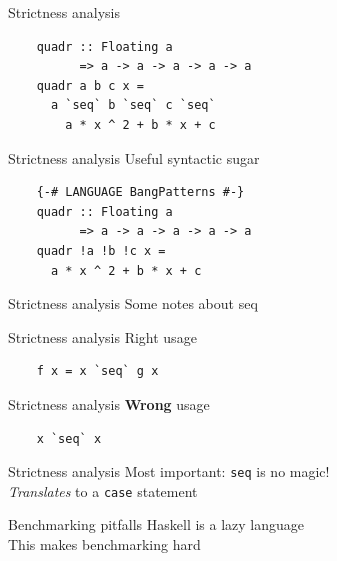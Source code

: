 \documentclass[20pt]{beamer}
\newcommand{\vspaced}{
    \vspace{5mm}
}
\begin{document}
\begin{frame}[fragile]{Strictness analysis}
    \begin{lstlisting}
    quadr :: Floating a
          => a -> a -> a -> a -> a
    quadr a b c x =
      a `seq` b `seq` c `seq`
        a * x ^ 2 + b * x + c
    \end{lstlisting}
\end{frame}

\begin{frame}[fragile]{Strictness analysis}
    Useful syntactic sugar \\
    \vspaced
    \begin{lstlisting}
    {-# LANGUAGE BangPatterns #-}
    quadr :: Floating a
          => a -> a -> a -> a -> a
    quadr !a !b !c x =
      a * x ^ 2 + b * x + c
    \end{lstlisting}
\end{frame}

\begin{frame}{Strictness analysis}
    Some notes about seq
\end{frame}

\begin{frame}[fragile]{Strictness analysis}
    Right usage
    \vspaced
    \begin{lstlisting}
    f x = x `seq` g x
    \end{lstlisting}
\end{frame}

\begin{frame}[fragile]{Strictness analysis}
    \textbf{Wrong} usage
    \vspaced
    \begin{lstlisting}
    x `seq` x
    \end{lstlisting}
\end{frame}

\begin{frame}[fragile]{Strictness analysis}
    Most important: \texttt{seq} is no magic! \\
    \textit{Translates} to a \texttt{case} statement
\end{frame}




\begin{frame}{Benchmarking pitfalls}
    Haskell is a lazy language \\
    This makes benchmarking hard
\end{frame}
\end{document}

